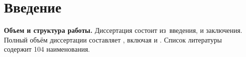 \chapter*{Введение}                         %

\newcommand{\actuality}{}
\newcommand{\progress}{}
\newcommand{\aim}{{\textbf\aimTXT}}
\newcommand{\tasks}{\textbf{\tasksTXT}}
\newcommand{\novelty}{\textbf{\noveltyTXT}}
\newcommand{\influence}{\textbf{\influenceTXT}}
\newcommand{\methods}{\textbf{\methodsTXT}}
\newcommand{\defpositions}{\textbf{\defpositionsTXT}}
\newcommand{\reliability}{\textbf{\reliabilityTXT}}
\newcommand{\probation}{\textbf{\probationTXT}}
\newcommand{\contribution}{\textbf{\contributionTXT}}
\newcommand{\publications}{\textbf{\publicationsTXT}}


\textbf{Объем и структура работы.} Диссертация состоит из~введения,
 и
заключения.
%
Полный объём диссертации составляет
, включая
 и
.
Список литературы содержит 104 наименования.



